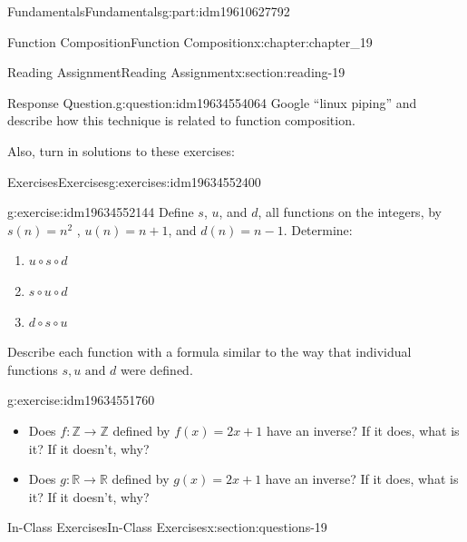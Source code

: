 \documentclass[oneside,10pt,]{book}
\numberwithin{equation}{section}
\begin{document}
\begin{partptx}{Fundamentals}{}{Fundamentals}{}{}{g:part:idm19610627792}
\begin{chapterptx}{Function Composition}{}{Function Composition}{}{}{x:chapter:chapter_19}
\begin{sectionptx}{Reading Assignment}{}{Reading Assignment}{}{}{x:section:reading-19}
\begin{question}{Response Question.}{g:question:idm19634554064}
Google ``linux piping'' and describe how this technique is related to function composition.%
\end{question}
Also, turn in solutions to these exercises:%
%
%
\typeout{************************************************}
\typeout{************************************************}
%
\begin{exercises-subsection-numberless}{Exercises}{}{Exercises}{}{}{g:exercises:idm19634552400}
\par\medskip\noindent%
%
\begin{exercisegroup}
\begin{divisionexerciseeg}{1}{}{}{g:exercise:idm19634552144}%
Define \(s\), \(u\), and \(d\), all functions on the integers, by \(s(n) = n^2\) , \(u(n) = n + 1\), and \(d(n) = n-1\). Determine:%
\begin{enumerate}[label=(\alph*)]
\item{}\(\displaystyle u \circ  s \circ  d\)%
\item{}\(\displaystyle s \circ  u\circ  d\)%
\item{}\(\displaystyle d \circ  s \circ  u\)%
\end{enumerate}
Describe each function with a formula similar to the way that individual functions \(s, u \textrm{ and } d\) were defined.%
\end{divisionexerciseeg}%
\begin{divisionexerciseeg}{2}{}{}{g:exercise:idm19634551760}%
%
\begin{itemize}[label=\textbullet]
\item{}Does \(f:\mathbb{Z} \rightarrow \mathbb{Z}\) defined by \(f(x)=2x+1\) have an inverse? If it does, what is it? If it doesn't, why?%
\item{}Does \(g:\mathbb{R} \rightarrow \mathbb{R}\) defined by \(g(x)=2x+1\) have an inverse? If it does, what is it? If it doesn't, why?%
\end{itemize}
%
\end{divisionexerciseeg}%
\end{exercisegroup}
\par\medskip\noindent
\end{exercises-subsection-numberless}
\end{sectionptx}
%
%
\typeout{************************************************}
\typeout{************************************************}
%
\begin{sectionptx}{In-Class Exercises}{}{In-Class Exercises}{}{}{x:section:questions-19}

\end{sectionptx}
\end{chapterptx}
\end{partptx}
\end{document}
